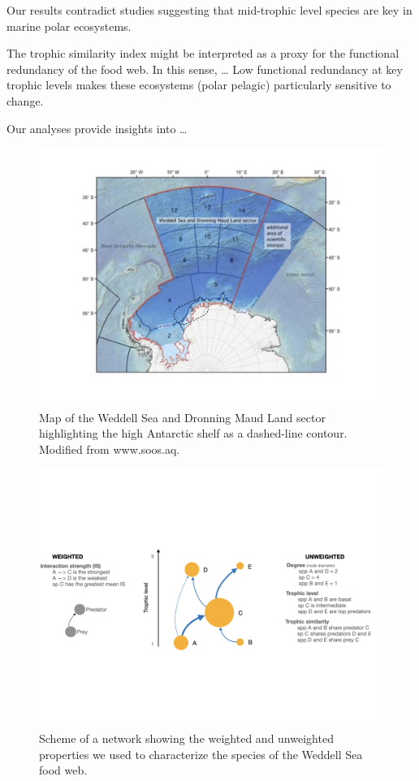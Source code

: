 \documentclass[gc, manuscript]{copernicus}
\begin{document}
Our results contradict studies suggesting that mid-trophic level species
are key in marine polar ecosystems.

The trophic similarity index might be interpreted as a proxy for the
functional redundancy of the food web. In this sense, \ldots{} Low
functional redundancy at key trophic levels makes these ecosystems
(polar pelagic) particularly sensitive to change. \citep{Murphy2016}

\clearpage
\conclusions[Conclusions]

Our analyses provide insights into \ldots{}

\clearpage

\begin{figure}
\includegraphics[width=12cm]{Fig.1_StudyMap} \caption{Map of the Weddell Sea and Dronning Maud Land sector highlighting the high Antarctic shelf as a dashed-line contour. Modified from www.soos.aq.}\label{fig:unnamed-chunk-1}
\end{figure}

\clearpage

\begin{figure}
\includegraphics[width=12cm]{Fig.2_ToyFoodWeb} \caption{Scheme of a network showing the weighted and unweighted properties we used to characterize the species of the Weddell Sea food web.}\label{fig:unnamed-chunk-2}
\end{figure}
\end{document}
